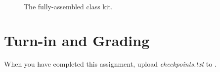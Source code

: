 \begin{figure}
    \centering

    \caption{The fully-assembled class kit.\label{fig:complete}}
\end{figure}

\section*{Turn-in and Grading}

When you have completed this assignment, upload \textit{checkpoints.txt} to
\filesubmission.

